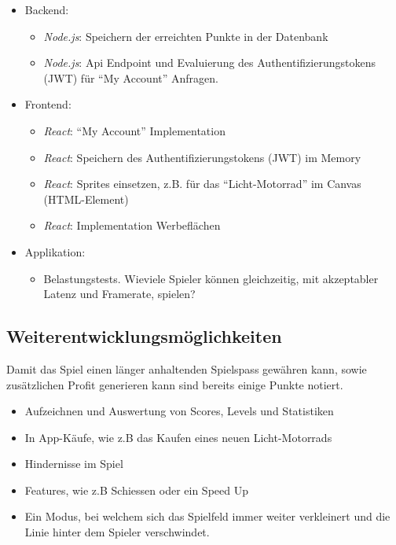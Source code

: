 \documentclass[11pt,ngerman]{article}
\newcommand{\quotes}[1]{``#1''}
\begin{document}
	\begin{itemize}
        \item Backend:
            \begin{itemize}
                \item \textit{Node.js}: Speichern der erreichten Punkte in der Datenbank
                \item \textit{Node.js}:  Api Endpoint und Evaluierung des Authentifizierungstokens (JWT) für \quotes{My Account} Anfragen.
            \end{itemize}
       \item Frontend:
            \begin{itemize}
                \item \textit{React}: \quotes{My Account} Implementation
                \item \textit{React}: Speichern des Authentifizierungstokens (JWT) im Memory
                \item \textit{React}: \Glspl{Sprite} einsetzen, z.B. für das \quotes{Licht-Motorrad} im \Gls{Canvas} (HTML-Element)
                 \item \textit{React}: Implementation Werbeflächen
            \end{itemize}
        \item Applikation:
            \begin{itemize}
                \item Belastungstests. Wieviele Spieler können gleichzeitig, mit akzeptabler Latenz und Framerate, spielen?
            \end{itemize}
	\end{itemize}

    \subsection{Weiterentwicklungsmöglichkeiten}
    Damit das Spiel einen länger anhaltenden Spielspass gewähren kann, sowie zusätzlichen Profit generieren kann sind bereits einige Punkte notiert.

    \begin{itemize}
	    \item Aufzeichnen und Auswertung von Scores, Levels und Statistiken
	    \item In App-Käufe, wie z.B das Kaufen eines neuen Licht-Motorrads
	    \item Hindernisse im Spiel
	    \item Features, wie z.B Schiessen oder ein Speed Up
		\item Ein Modus, bei welchem sich das Spielfeld immer weiter verkleinert und die Linie hinter dem Spieler verschwindet.
	\end{itemize}
\end{document}
